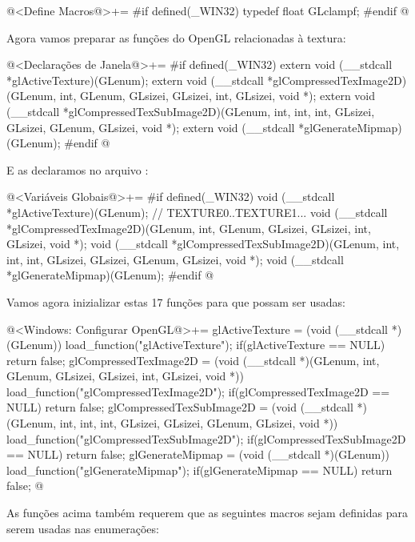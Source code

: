 \iniciocodigo
@<Define Macros@>+=
#if defined(_WIN32)
typedef float GLclampf;
#endif
@
\fimcodigo

Agora vamos preparar as funções do OpenGL relacionadas à textura:

\iniciocodigo
@<Declarações de Janela@>+=
#if defined(_WIN32)
extern void (__stdcall *glActiveTexture)(GLenum);
extern void (__stdcall *glCompressedTexImage2D)(GLenum, int, GLenum, GLsizei,
                                                GLsizei, int, GLsizei, void *);
extern void (__stdcall *glCompressedTexSubImage2D)(GLenum, int, int, int, GLsizei,
                                                   GLsizei, GLenum, GLsizei,
                                                   void *);
extern void (__stdcall *glGenerateMipmap)(GLenum);
#endif
@
\fimcodigo

E as declaramos no arquivo :

\iniciocodigo
@<Variáveis Globais@>+=
#if defined(_WIN32)
void (__stdcall *glActiveTexture)(GLenum); // TEXTURE0..TEXTURE1...
void (__stdcall *glCompressedTexImage2D)(GLenum, int, GLenum, GLsizei,
                                         GLsizei, int, GLsizei, void *);
void (__stdcall *glCompressedTexSubImage2D)(GLenum, int, int, int, GLsizei,
                                            GLsizei, GLenum, GLsizei,
                                            void *);
void (__stdcall *glGenerateMipmap)(GLenum);
#endif
@
\fimcodigo

Vamos agora inizializar estas 17 funções para que possam ser usadas:

\iniciocodigo
@<Windows: Configurar OpenGL@>+=
glActiveTexture = (void (__stdcall *)(GLenum)) load_function("glActiveTexture");
if(glActiveTexture == NULL) return false;
glCompressedTexImage2D = (void (__stdcall *)(GLenum, int, GLenum, GLsizei,
                            GLsizei, int, GLsizei, void *))
                                  load_function("glCompressedTexImage2D");
if(glCompressedTexImage2D == NULL) return false;
glCompressedTexSubImage2D = (void (__stdcall *)(GLenum, int, int, int, GLsizei,
                              GLsizei, GLenum, GLsizei, void *))
                                   load_function("glCompressedTexSubImage2D");
if(glCompressedTexSubImage2D == NULL) return false;
glGenerateMipmap = (void (__stdcall *)(GLenum)) load_function("glGenerateMipmap");
if(glGenerateMipmap == NULL) return false;
@
\fimcodigo

As funções acima também requerem que as seguintes macros sejam
definidas para serem usadas nas enumerações:

